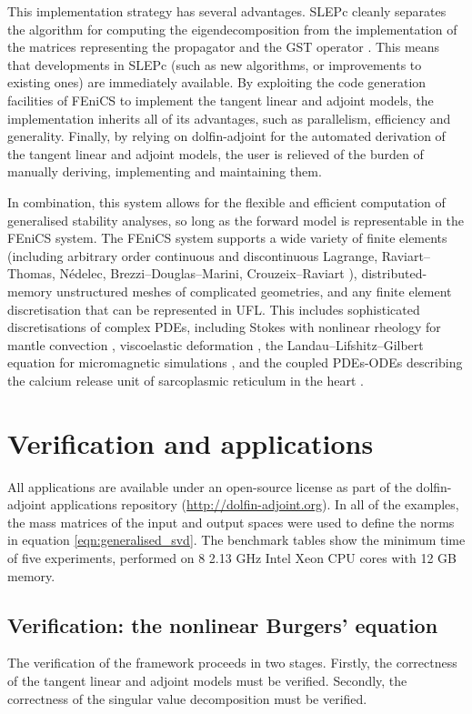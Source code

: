 \documentclass{siamltex}
\begin{document}
This implementation strategy has several advantages. SLEPc cleanly separates the algorithm for computing the
eigendecomposition from the implementation of the matrices representing the propagator  and the GST
operator .  This means that developments in SLEPc (such as new algorithms, or improvements to existing ones) are
immediately available.  By exploiting the code generation facilities of FEniCS to implement the tangent linear
and adjoint models, the implementation inherits all of its advantages, such as parallelism,
efficiency and generality.  Finally, by relying on dolfin-adjoint for the automated derivation of the tangent
linear and adjoint models, the user is relieved of the burden of manually deriving, implementing and
maintaining them. 

In combination, this system allows for the flexible and efficient computation of generalised
stability analyses, so long as the forward model is representable in the FEniCS system. The FEniCS system
supports a wide variety of finite elements (including arbitrary order continuous and discontinuous Lagrange, Raviart--Thomas, Nédelec,
Brezzi--Douglas--Marini, Crouzeix--Raviart \cite{kirby2004}), distributed-memory unstructured meshes of complicated geometries,
and any finite element discretisation that can be represented in UFL. This includes sophisticated
discretisations of complex PDEs, including Stokes with nonlinear rheology for mantle convection
\cite{vynnytska2013}, viscoelastic deformation \cite{rognes2010b}, the
Landau--Lifshitz--Gilbert equation for micromagnetic simulations \cite{abert2013}, and the coupled
PDEs-ODEs describing the calcium release unit of sarcoplasmic reticulum in the heart \cite{hake2013}.

\section{Verification and applications} \label{sec:examples}
All applications are available under an open-source license as part of the dolfin-adjoint applications
repository (\url{http://dolfin-adjoint.org}). In all of the examples, the mass matrices of the input
and output spaces were used to define the norms in equation \eqref{eqn:generalised_svd}.
The benchmark tables show the minimum time of five experiments, performed on 8 2.13 GHz Intel Xeon CPU cores with 12 GB memory.

\subsection{Verification: the nonlinear Burgers' equation}
The verification of the framework proceeds in two stages. Firstly, the correctness of the tangent linear
and adjoint models must be verified. Secondly, the correctness of the singular value decomposition
must be verified.
\end{document}

